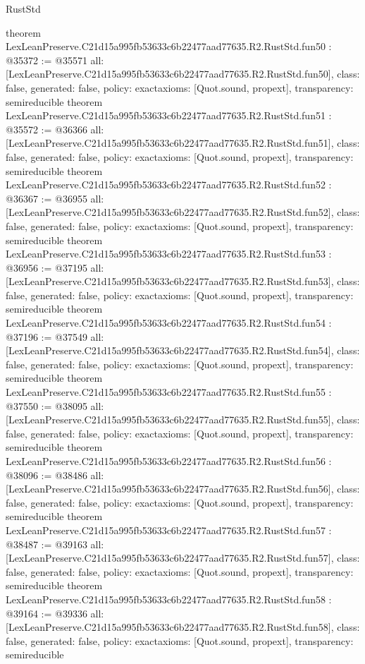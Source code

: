 \begin{lexlean}{RustStd}
\begin{coremodule}
{}
theorem LexLeanPreserve.C21d15a995fb53633c6b22477aad77635.R2.RustStd.fun50 : @35372 := @35571 {
  all: [LexLeanPreserve.C21d15a995fb53633c6b22477aad77635.R2.RustStd.fun50],
  class: false,
  generated: false,
  policy: exact{axioms: [Quot.sound, propext]},
  transparency: semireducible
}
theorem LexLeanPreserve.C21d15a995fb53633c6b22477aad77635.R2.RustStd.fun51 : @35572 := @36366 {
  all: [LexLeanPreserve.C21d15a995fb53633c6b22477aad77635.R2.RustStd.fun51],
  class: false,
  generated: false,
  policy: exact{axioms: [Quot.sound, propext]},
  transparency: semireducible
}
theorem LexLeanPreserve.C21d15a995fb53633c6b22477aad77635.R2.RustStd.fun52 : @36367 := @36955 {
  all: [LexLeanPreserve.C21d15a995fb53633c6b22477aad77635.R2.RustStd.fun52],
  class: false,
  generated: false,
  policy: exact{axioms: [Quot.sound, propext]},
  transparency: semireducible
}
theorem LexLeanPreserve.C21d15a995fb53633c6b22477aad77635.R2.RustStd.fun53 : @36956 := @37195 {
  all: [LexLeanPreserve.C21d15a995fb53633c6b22477aad77635.R2.RustStd.fun53],
  class: false,
  generated: false,
  policy: exact{axioms: [Quot.sound, propext]},
  transparency: semireducible
}
theorem LexLeanPreserve.C21d15a995fb53633c6b22477aad77635.R2.RustStd.fun54 : @37196 := @37549 {
  all: [LexLeanPreserve.C21d15a995fb53633c6b22477aad77635.R2.RustStd.fun54],
  class: false,
  generated: false,
  policy: exact{axioms: [Quot.sound, propext]},
  transparency: semireducible
}
theorem LexLeanPreserve.C21d15a995fb53633c6b22477aad77635.R2.RustStd.fun55 : @37550 := @38095 {
  all: [LexLeanPreserve.C21d15a995fb53633c6b22477aad77635.R2.RustStd.fun55],
  class: false,
  generated: false,
  policy: exact{axioms: [Quot.sound, propext]},
  transparency: semireducible
}
theorem LexLeanPreserve.C21d15a995fb53633c6b22477aad77635.R2.RustStd.fun56 : @38096 := @38486 {
  all: [LexLeanPreserve.C21d15a995fb53633c6b22477aad77635.R2.RustStd.fun56],
  class: false,
  generated: false,
  policy: exact{axioms: [Quot.sound, propext]},
  transparency: semireducible
}
theorem LexLeanPreserve.C21d15a995fb53633c6b22477aad77635.R2.RustStd.fun57 : @38487 := @39163 {
  all: [LexLeanPreserve.C21d15a995fb53633c6b22477aad77635.R2.RustStd.fun57],
  class: false,
  generated: false,
  policy: exact{axioms: [Quot.sound, propext]},
  transparency: semireducible
}
theorem LexLeanPreserve.C21d15a995fb53633c6b22477aad77635.R2.RustStd.fun58 : @39164 := @39336 {
  all: [LexLeanPreserve.C21d15a995fb53633c6b22477aad77635.R2.RustStd.fun58],
  class: false,
  generated: false,
  policy: exact{axioms: [Quot.sound, propext]},
  transparency: semireducible
}
\end{coremodule}
\end{lexlean}
